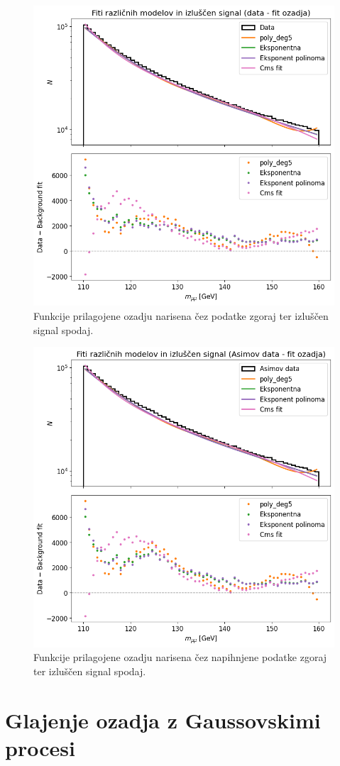 \documentclass[slovene,11pt,a4paper]{article}
\begin{document}
\begin{figure}[h!]
    \centering
    \includegraphics[width=0.8\linewidth]{imgs/IzluscenSignalData.png}
    \caption{Funkcije prilagojene ozadju narisena čez podatke zgoraj ter izluščen signal spodaj.}
    \label{fig:IzluscenSignalData}
\end{figure}

\newpage

\begin{figure}[h!]
    \centering
    \includegraphics[width=0.8\linewidth]{imgs/IzluscenSignalAsimovData.png}
    \caption{Funkcije prilagojene ozadju narisena čez napihnjene podatke zgoraj ter izluščen signal spodaj.}
    \label{fig:IzluscenSignalAsimovData}
\end{figure}

\section{Glajenje ozadja z Gaussovskimi procesi}
\end{document}
